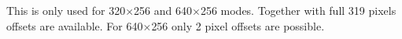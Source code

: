\subsubsection{}

\begin{NextPort}
\end{NextPort}

This is only used for 320$\times$256 and 640$\times$256 modes. Together with  full 319 pixels offsets are available. For 640$\times$256 only 2 pixel offsets are possible.


\pagebreak
